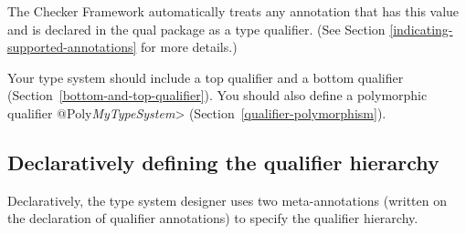 The Checker Framework automatically treats any annotation that has this value
and is declared in the qual package as a type qualifier.
(See Section \ref{indicating-supported-annotations} for more details.)


Your type system should include a top qualifier and a bottom qualifier
(Section~\ref{bottom-and-top-qualifier}).  You should also define a
polymorphic qualifier \<@Poly\emph{MyTypeSystem}>
(Section~\ref{qualifier-polymorphism}).


\subsection{Declaratively defining the qualifier hierarchy\label{declarative-hierarchy}}

Declaratively, the type system designer uses two meta-annotations (written
on the declaration of qualifier annotations) to specify the qualifier
hierarchy.

